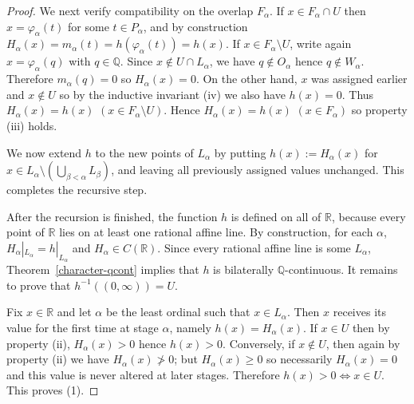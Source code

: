 \documentclass[11pt]{amsart} %
\theoremstyle{definition}
\begin{document}
\begin{proof}
We next verify compatibility on the overlap $F_{\alpha}$. If $x\in F_{\alpha}\cap U$ then $x=\varphi_{\alpha}(t)$ for some $t\in P_{\alpha}$, and by construction $H_{\alpha}(x)=m_{\alpha}(t)=h(\varphi_{\alpha}(t))=h(x)$. If $x\in F_{\alpha}\setminus U$, write again $x=\varphi_{\alpha}(q)$ with $q\in\mathbb{Q}$. Since $x\notin U\cap L_{\alpha}$, we have $q\notin O_{\alpha}$ hence $q\notin W_{\alpha}$. Therefore $m_{\alpha}(q)=0$ so $H_{\alpha}(x)=0$. On the other hand, $x$ was assigned earlier and $x\notin U$ so by the inductive invariant (iv) we also have $h(x)=0$. Thus $H_{\alpha}(x)=h(x)$ $(x\in F_{\alpha}\setminus U)$. Hence $H_{\alpha}(x)=h(x)$ $(x\in F_{\alpha})$ so property (iii) holds.

We now extend $h$ to the new points of $L_{\alpha}$ by putting $h(x):=H_{\alpha}(x)$ for $x \in L_{\alpha} \setminus (\bigcup_{\beta<\alpha} L_{\beta})$, and leaving all previously assigned values unchanged. This completes the recursive step.

After the recursion is finished, the function $h$ is defined on all of $\mathbb{R}$, because every point of $\mathbb{R}$ lies on at least one rational affine line. By construction, for each $\alpha$, $H_{\alpha}|_{L_{\alpha}}=h|_{L_{\alpha}}$ and $H_{\alpha}\in C(\mathbb{R})$. Since every rational affine line is some $L_{\alpha}$, Theorem~\ref{character-qcont} implies that $h$ is bilaterally $\mathbb{Q}$-continuous. It remains to prove that $h^{-1}((0,\infty))=U$.

Fix $x\in\mathbb{R}$ and let $\alpha$ be the least ordinal such that $x\in L_{\alpha}$. Then $x$ receives its value for the first time at stage $\alpha$, namely $h(x)=H_{\alpha}(x)$. If $x\in U$ then by property (ii), $H_{\alpha}(x)>0$ hence $h(x)>0$. Conversely, if $x\notin U$, then again by property (ii) we have $H_{\alpha}(x) \not> 0$; but $H_{\alpha}(x)\ge0$ so necessarily $H_{\alpha}(x)=0$ and this value is never altered at later stages. Therefore $h(x)>0\iff x\in U$. This proves (1).


\end{proof}
\end{document}
